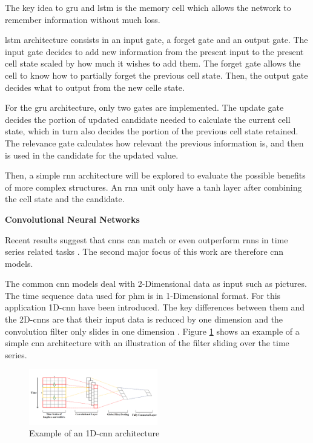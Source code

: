\documentclass[conference]{IEEEtran}
\begin{document}
The key idea to \gls{gru} and \gls{lstm} is the memory cell which allows the network to remember information without much loss.

\gls{lstm} architecture consists in an input gate, a forget gate and an output gate. The input gate decides to add new information from the present input to the present cell state scaled by how much it wishes to add them. The forget gate allows the cell to know how to partially forget the previous cell state. Then, the output gate decides what to output from the new celle state.

For the \gls{gru} architecture, only two gates are implemented. The update gate decides the portion of updated candidate needed to calculate the current cell state, which in turn also decides the portion of the previous cell state retained. The relevance gate calculates how relevant the previous information is, and then is used in the candidate for the updated value.

Then, a simple \gls{rnn} architecture will be explored to evaluate the possible benefits of more complex structures. An \gls{rnn} unit only have a tanh layer after combining the cell state and the candidate.







\noindent
\textbf{Convolutional Neural Networks}

Recent results suggest that \glspl{cnn} can match or even outperform \glspl{rnn} in time series related tasks \cite{Bai2018}. The second major focus of this work are therefore \gls{cnn} models.

The common \gls{cnn} models deal with 2-Dimensional data as input such as pictures. The time sequence data used for \gls{phm} is in 1-Dimensional format. For this application 1D-\gls{cnn} have been introduced. The key differences between them and the 2D-\glspl{cnn} are that their input data is reduced by one dimension and the convolution filter only slides in one dimension \cite{Akrim2021}. Figure \ref{fig:1D_cnn_architecture} shows an example of a simple \gls{cnn} architecture with an illustration of the filter sliding over the time series. 

\begin{figure}[htp]
	\centering
	\includegraphics[width=0.5\textwidth]{1D_CNN_Architecture.png}
	\caption{Example of an 1D-\gls{cnn} architecture \cite{Sayyad}}
	\label{fig:1D_cnn_architecture}
\end{figure}
\end{document}
